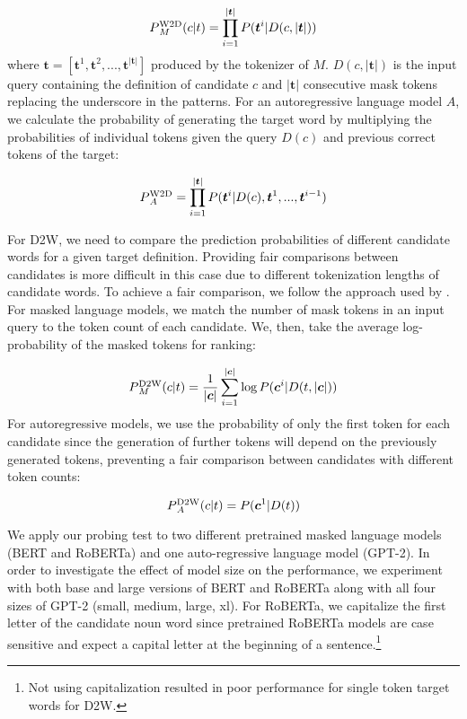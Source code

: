 \documentclass[11pt,a4paper]{article}
\def\uprm#1#2{\mbox{$_#2^{\hbox{\scriptsize #1}}$}}
\begin{document}
\begin{equation*}
  P\uprm{W2D}{M} (c|t) = \prod_{i=1}^{|\bm{t}|}P(\bm{t}^i|D(c,|\bm{t}|))
\end{equation*}
where $\bm{t} = [\bm{t}^1, \bm{t}^2,...,\bm{t}^{|\bm{t}|}]$ produced by the tokenizer of $M$. $D(c,|\bm{t}|)$ is the input query containing the definition of candidate $c$ and $|\bm{t}|$ consecutive mask tokens replacing the underscore in the patterns. For an autoregressive language model $A$, we calculate the probability of generating the target word by multiplying the probabilities of individual tokens given the query $D(c)$ and previous correct tokens of the target:

\begin{equation*}
    P\uprm{W2D}{A} = \prod_{i=1}^{|\bm{t}|}P(\bm{t}^i|D(c),\bm{t}^{1},...,\bm{t}^{i-1})
\end{equation*}

For D2W, we need to compare the prediction probabilities of
different candidate words for a given target
definition. Providing fair comparisons between candidates is
more difficult in this case due to different tokenization
lengths of candidate words. To achieve a fair comparison, we
follow the approach used by . For masked language models, we match the number of mask tokens in an input query to the token count of each candidate. We, then, take the average log-probability of the masked tokens for ranking:

\begin{equation*}
    P\uprm{D2W}{M}(c|t) =
    \frac{1}{|\bm{c}|}\sum_{i=1}^{|\bm{c}|}\log P(\bm{c}^i |
    D(t,|\bm{c}|))
\end{equation*}
For autoregressive models, we use the probability of only the first token for each candidate since the generation of further tokens will depend on the previously generated tokens, preventing a fair comparison between candidates with different token counts:

\begin{equation*}
    P\uprm{D2W}{A}(c|t) =
     P(\bm{c}^1 |
    D(t))
\end{equation*}

We apply our probing test to two different pretrained
masked language models (BERT and
RoBERTa) and one auto-regressive language model
(GPT-2). 
In order to investigate the effect of model
size on the performance, we experiment with both
base and large versions of BERT and RoBERTa
along with all four sizes of GPT-2 (small, medium,
large, xl). 
For RoBERTa, we capitalize the first letter of the candidate
noun word since pretrained RoBERTa models are case sensitive
and expect a capital letter at the beginning of a
sentence.\footnote{Not using capitalization  resulted in
  poor performance for single token target words for D2W.}
\end{document}
